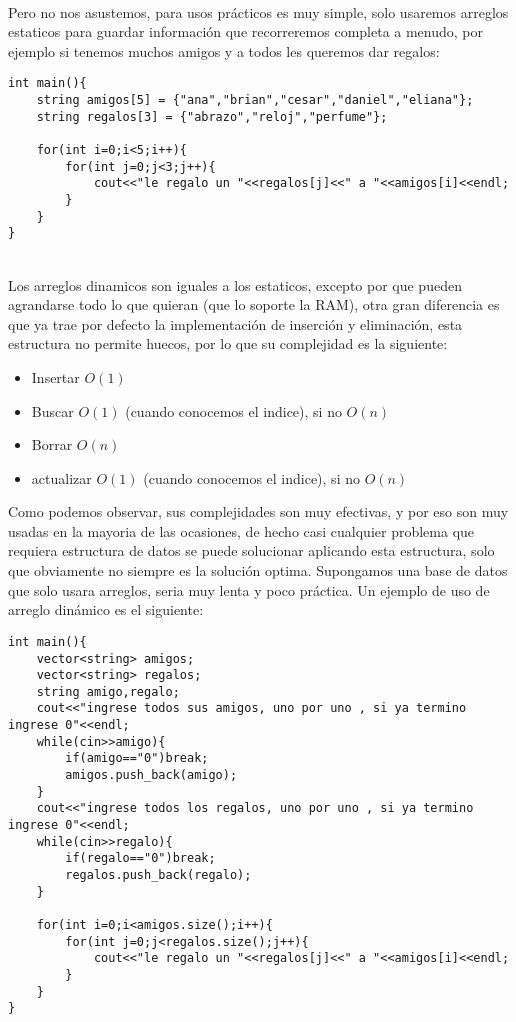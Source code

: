\\Pero no nos asustemos, para usos prácticos es muy simple, solo usaremos arreglos estaticos para guardar información que recorreremos completa a menudo, por ejemplo si tenemos muchos amigos y a todos les queremos dar regalos:
\\\begin{minipage}{\textwidth}
\begin{lstlisting}[style=C,caption=arregloAmigos.cpp]
int main(){
    string amigos[5] = {"ana","brian","cesar","daniel","eliana"};
    string regalos[3] = {"abrazo","reloj","perfume"};

    for(int i=0;i<5;i++){
        for(int j=0;j<3;j++){
            cout<<"le regalo un "<<regalos[j]<<" a "<<amigos[i]<<endl;
        }
    }
}
\end{lstlisting}
\end{minipage}
\\Los arreglos dinamicos son iguales a los estaticos, excepto por que pueden agrandarse todo lo que quieran (que lo soporte la RAM), otra gran diferencia es que ya trae por defecto la implementación de inserción y eliminación, esta estructura no permite huecos, por lo que su complejidad es la siguiente:
\begin{itemize}
    \item Insertar $O(1)$
    \item Buscar   $O(1)$ (cuando conocemos el indice), si no $O(n)$
    \item Borrar   $O(n)$ 
    \item actualizar $O(1)$ (cuando conocemos el indice), si no $O(n)$
\end{itemize}
Como podemos observar, sus complejidades son muy efectivas, y por eso son muy usadas en la mayoria de las ocasiones, de hecho casi cualquier problema que requiera estructura de datos se puede solucionar aplicando esta estructura, solo que obviamente no siempre es la solución optima. Supongamos una base de datos que solo usara arreglos, seria muy lenta y poco práctica.
Un ejemplo de uso de arreglo dinámico es el siguiente:
\\\begin{minipage}{\textwidth}
\begin{lstlisting}[style=C,caption=arregloDinamicoAmigos.cpp]
int main(){
    vector<string> amigos;
    vector<string> regalos;
    string amigo,regalo;
    cout<<"ingrese todos sus amigos, uno por uno , si ya termino ingrese 0"<<endl;
    while(cin>>amigo){
        if(amigo=="0")break;
        amigos.push_back(amigo);
    }
    cout<<"ingrese todos los regalos, uno por uno , si ya termino ingrese 0"<<endl;
    while(cin>>regalo){
        if(regalo=="0")break;
        regalos.push_back(regalo);
    }

    for(int i=0;i<amigos.size();i++){
        for(int j=0;j<regalos.size();j++){
            cout<<"le regalo un "<<regalos[j]<<" a "<<amigos[i]<<endl;
        }
    }
}
\end{lstlisting}
\end{minipage}
